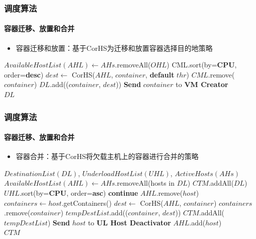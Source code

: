 \begin{frame}
\frametitle{调度算法}
\framesubtitle{容器迁移、放置和合并}
\begin{itemize}
    \item 容器迁移和放置：基于CorHS为迁移和放置容器选择目的地策略
\end{itemize}
\begin{algorithmic}[1]
  \State $AvailableHostList(AHL) \gets AHs$.removeAll($OHL$)
  \State CML.sort(by=\textbf{CPU}, order=\textbf{desc}) 
      
    \State $dest \gets$ CorHS($AHL$, $container$, \textbf{default} $thr$)   
       
      \State $CML$.remove($container$)
      \State $DL$.add(($container$, $dest$))
    \Else   {}
      \State \textbf{Send} $container$ to \textbf{VM Creator}
    \EndIf
  \EndFor\\
  \Return $DL$
  \end{algorithmic}
\end{frame}

\begin{frame}[allowframebreaks]
\frametitle{调度算法}
\framesubtitle{容器迁移、放置和合并}
\begin{itemize}
    \item 容器合并：基于CorHS将欠载主机上的容器进行合并的策略
\end{itemize}
\begin{algorithmic}[1]
  \Require
     $DestinationList(DL)$,
     $UnderloadHostList(UHL)$, $ActiveHosts(AHs)$
     
  \State $AvailableHostList(AHL) \gets AHs$.removeAll(hosts in $DL$)
  \State $CTM$.addAll($DL$) 
  \State $UHL$.sort(by=\textbf{CPU}, order=\textbf{asc})
   
      
      \State \textbf{continue}
    \Else
      \State $AHL$.remove($host$)   
      \State $containers \gets host$.getContainers()
       
        \State $dest \gets$ CorHS($AHL$, $container$)
           
          \State $containers$.remove($container$)
          \State $tempDestList$.add(($container$, $dest$))
        \EndIf
      \EndFor
        
        \State $CTM$.addAll($tempDestList$) 
        \State \textbf{Send} $host$ to \textbf{UL Host Deactivator} 
      \Else
        \State $AHL$.add($host$) 
      \EndIf
    \EndIf
  \EndFor\\
  \Return $CTM$
  \end{algorithmic}
\end{frame}

